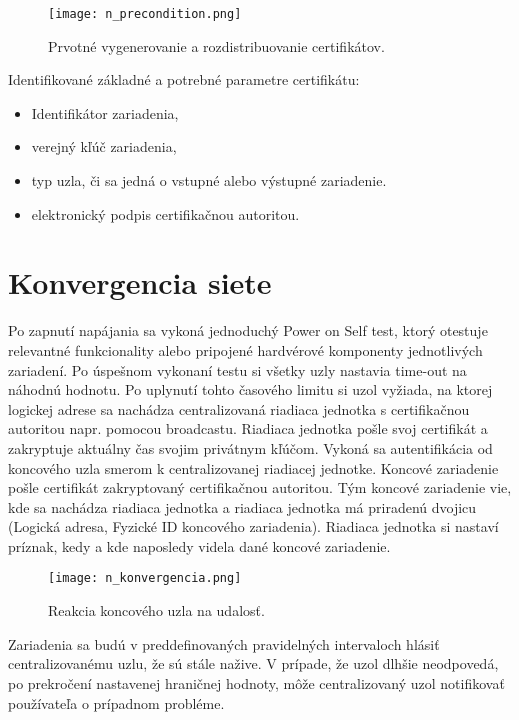\documentclass[12pt,a4paper,oneside,openright]{report}
\begin{document}

\begin{figure*}[h]
	\centering
	\texttt{[image: n\_precondition.png]}
	\caption{Prvotné vygenerovanie a rozdistribuovanie certifikátov.}
	\label{f:n_CA_distribution}
\end{figure*}


Identifikované základné a potrebné parametre  certifikátu:
\begin{itemize}
	\item Identifikátor zariadenia,
	\item verejný kľúč zariadenia,
	\item typ uzla, či sa jedná o vstupné alebo výstupné zariadenie.
	\item elektronický podpis certifikačnou autoritou.
\end{itemize}
\onehalfspacing

\section{Konvergencia siete}
Po zapnutí napájania sa vykoná jednoduchý Power on Self test, ktorý otestuje relevantné funkcionality alebo pripojené hardvérové komponenty jednotlivých zariadení. Po úspešnom vykonaní testu si všetky uzly nastavia time-out na náhodnú hodnotu. Po uplynutí tohto časového limitu si uzol vyžiada, na ktorej logickej adrese sa nachádza centralizovaná riadiaca jednotka s certifikačnou autoritou napr. pomocou broadcastu. Riadiaca jednotka pošle svoj certifikát a zakryptuje aktuálny čas svojim privátnym kľúčom. Vykoná sa autentifikácia od koncového uzla smerom k centralizovanej riadiacej jednotke. Koncové zariadenie pošle certifikát zakryptovaný certifikačnou autoritou. Tým koncové zariadenie vie, kde sa nachádza riadiaca jednotka a riadiaca jednotka má priradenú dvojicu (Logická adresa, Fyzické ID koncového zariadenia). Riadiaca jednotka si nastaví príznak, kedy a kde naposledy videla dané koncové zariadenie.

\begin{figure*}[h]
	\centering
	\texttt{[image: n\_konvergencia.png]}
	\caption{Reakcia koncového uzla na udalosť.}
	\label{f:n_konvergenica}
\end{figure*}

Zariadenia sa budú v preddefinovaných pravidelných intervaloch hlásiť centralizovanému uzlu, že sú stále nažive. V prípade, že uzol dlhšie neodpovedá, po prekročení nastavenej hraničnej hodnoty, môže centralizovaný uzol notifikovať používateľa o prípadnom probléme.
\end{document}
